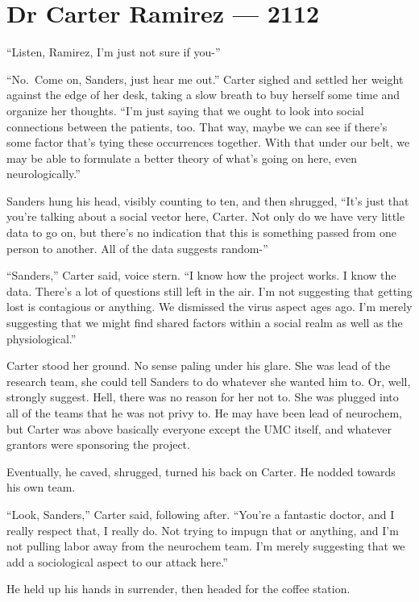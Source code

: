 \chapter*{Dr Carter Ramirez — 2112}

``Listen, Ramirez, I'm just not sure if you-''

``No.~Come on, Sanders, just hear me out.'' Carter sighed and settled her weight against the edge of her desk, taking a slow breath to buy herself some time and organize her thoughts. ``I'm just saying that we ought to look into social connections between the patients, too. That way, maybe we can see if there's some factor that's tying these occurrences together. With that under our belt, we may be able to formulate a better theory of what's going on here, even neurologically.''

Sanders hung his head, visibly counting to ten, and then shrugged, ``It's just that you're talking about a social vector here, Carter. Not only do we have very little data to go on, but there's no indication that this is something passed from one person to another. All of the data suggests random-''

``Sanders,'' Carter said, voice stern. ``I know how the project works. I know the data. There's a lot of questions still left in the air. I'm not suggesting that getting lost is contagious or anything. We dismissed the virus aspect ages ago. I'm merely suggesting that we might find shared factors within a social realm as well as the physiological.''

Carter stood her ground. No sense paling under his glare. She was lead of the research team, she could tell Sanders to do whatever she wanted him to. Or, well, strongly suggest. Hell, there was no reason for her not to. She was plugged into all of the teams that he was not privy to. He may have been lead of neurochem, but Carter was above basically everyone except the UMC itself, and whatever grantors were sponsoring the project.

Eventually, he caved, shrugged, turned his back on Carter. He nodded towards his own team.

``Look, Sanders,'' Carter said, following after. ``You're a fantastic doctor, and I really respect that, I really do. Not trying to impugn that or anything, and I'm not pulling labor away from the neurochem team. I'm merely suggesting that we add a sociological aspect to our attack here.''

He held up his hands in surrender, then headed for the coffee station.


